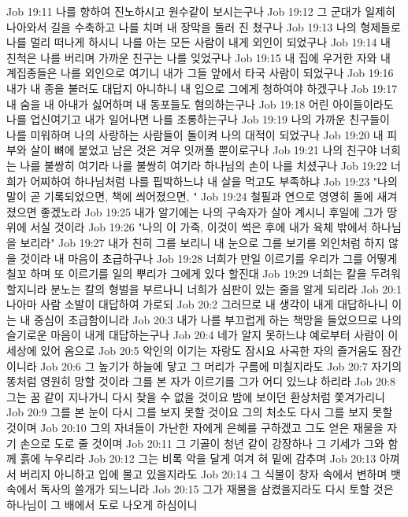 Job 19:11  나를 향하여 진노하시고 원수같이 보시는구나
Job 19:12  그 군대가 일제히 나아와서 길을 수축하고 나를 치며 내 장막을 둘러 진 쳤구나
Job 19:13  나의 형제들로 나를 멀리 떠나게 하시니 나를 아는 모든 사람이 내게 외인이 되었구나
Job 19:14  내 친척은 나를 버리며 가까운 친구는 나를 잊었구나
Job 19:15  내 집에 우거한 자와 내 계집종들은 나를 외인으로 여기니 내가 그들 앞에서 타국 사람이 되었구나
Job 19:16  내가 내 종을 불러도 대답지 아니하니 내 입으로 그에게 청하여야 하겠구나
Job 19:17  내 숨을 내 아내가 싫어하며 내 동포들도 혐의하는구나
Job 19:18  어린 아이들이라도 나를 업신여기고 내가 일어나면 나를 조롱하는구나
Job 19:19  나의 가까운 친구들이 나를 미워하며 나의 사랑하는 사람들이 돌이켜 나의 대적이 되었구나
Job 19:20  내 피부와 살이 뼈에 붙었고 남은 것은 겨우 잇꺼풀 뿐이로구나
Job 19:21  나의 친구야 너희는 나를 불쌍히 여기라 나를 불쌍히 여기라 하나님의 손이 나를 치셨구나
Job 19:22  너희가 어찌하여 하나님처럼 나를 핍박하느냐 내 살을 먹고도 부족하냐
Job 19:23  "나의 말이 곧 기록되었으면, 책에 씌어졌으면, "
Job 19:24  철필과 연으로 영영히 돌에 새겨졌으면 좋겠노라
Job 19:25  내가 알기에는 나의 구속자가 살아 계시니 후일에 그가 땅 위에 서실 것이라
Job 19:26  "나의 이 가죽, 이것이 썩은 후에 내가 육체 밖에서 하나님을 보리라"
Job 19:27  내가 친히 그를 보리니 내 눈으로 그를 보기를 외인처럼 하지 않을 것이라 내 마음이 초급하구나
Job 19:28  너희가 만일 이르기를 우리가 그를 어떻게 칠꼬 하며 또 이르기를 일의 뿌리가 그에게 있다 할진대
Job 19:29  너희는 칼을 두려워할지니라 분노는 칼의 형벌을 부르나니 너희가 심판이 있는 줄을 알게 되리라
Job 20:1  나아마 사람 소발이 대답하여 가로되
Job 20:2  그러므로 내 생각이 내게 대답하나니 이는 내 중심이 초급함이니라
Job 20:3  내가 나를 부끄럽게 하는 책망을 들었으므로 나의 슬기로운 마음이 내게 대답하는구나
Job 20:4  네가 알지 못하느냐 예로부터 사람이 이 세상에 있어 옴으로
Job 20:5  악인의 이기는 자랑도 잠시요 사곡한 자의 즐거움도 잠간이니라
Job 20:6  그 높기가 하늘에 닿고 그 머리가 구름에 미칠지라도
Job 20:7  자기의 똥처럼 영원히 망할 것이라 그를 본 자가 이르기를 그가 어디 있느냐 하리라
Job 20:8  그는 꿈 같이 지나가니 다시 찾을 수 없을 것이요 밤에 보이던 환상처럼 쫓겨가리니
Job 20:9  그를 본 눈이 다시 그를 보지 못할 것이요 그의 처소도 다시 그를 보지 못할 것이며
Job 20:10  그의 자녀들이 가난한 자에게 은혜를 구하겠고 그도 얻은 재물을 자기 손으로 도로 줄 것이며
Job 20:11  그 기골이 청년 같이 강장하나 그 기세가 그와 함께 흙에 누우리라
Job 20:12  그는 비록 악을 달게 여겨 혀 밑에 감추며
Job 20:13  아껴서 버리지 아니하고 입에 물고 있을지라도
Job 20:14  그 식물이 창자 속에서 변하며 뱃속에서 독사의 쓸개가 되느니라
Job 20:15  그가 재물을 삼켰을지라도 다시 토할 것은 하나님이 그 배에서 도로 나오게 하심이니
